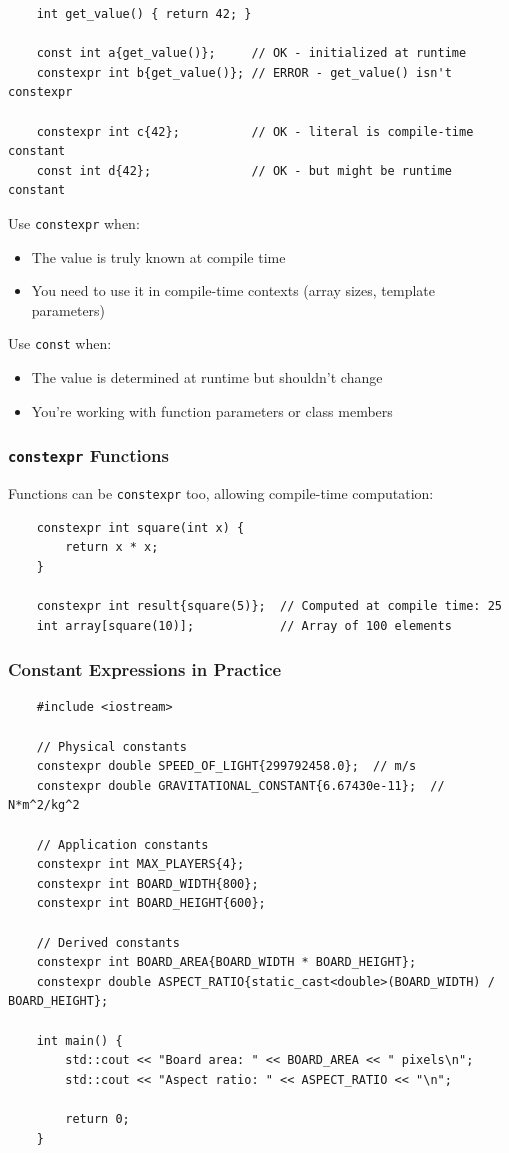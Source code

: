 \begin{lstlisting}
	int get_value() { return 42; }
	
	const int a{get_value()};     // OK - initialized at runtime
	constexpr int b{get_value()}; // ERROR - get_value() isn't constexpr
	
	constexpr int c{42};          // OK - literal is compile-time constant
	const int d{42};              // OK - but might be runtime constant
\end{lstlisting}

Use \texttt{constexpr} when:
\begin{itemize}
	\item The value is truly known at compile time
	\item You need to use it in compile-time contexts (array sizes, template parameters)
\end{itemize}

Use \texttt{const} when:
\begin{itemize}
	\item The value is determined at runtime but shouldn't change
	\item You're working with function parameters or class members
\end{itemize}

\subsubsection{\texttt{constexpr} Functions}

Functions can be \texttt{constexpr} too, allowing compile-time computation:

\begin{lstlisting}
	constexpr int square(int x) {
		return x * x;
	}
	
	constexpr int result{square(5)};  // Computed at compile time: 25
	int array[square(10)];            // Array of 100 elements
\end{lstlisting}

\subsubsection{Constant Expressions in Practice}

\begin{lstlisting}
	#include <iostream>
	
	// Physical constants
	constexpr double SPEED_OF_LIGHT{299792458.0};  // m/s
	constexpr double GRAVITATIONAL_CONSTANT{6.67430e-11};  // N*m^2/kg^2
	
	// Application constants
	constexpr int MAX_PLAYERS{4};
	constexpr int BOARD_WIDTH{800};
	constexpr int BOARD_HEIGHT{600};
	
	// Derived constants
	constexpr int BOARD_AREA{BOARD_WIDTH * BOARD_HEIGHT};
	constexpr double ASPECT_RATIO{static_cast<double>(BOARD_WIDTH) / BOARD_HEIGHT};
	
	int main() {
		std::cout << "Board area: " << BOARD_AREA << " pixels\n";
		std::cout << "Aspect ratio: " << ASPECT_RATIO << "\n";
		
		return 0;
	}
\end{lstlisting}


